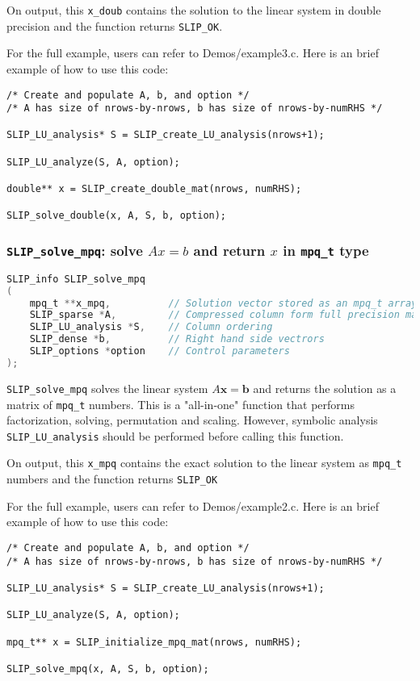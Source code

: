 \documentclass[12pt]{article}
\theoremstyle{definition}
\begin{document}
On output, this \verb|x_doub| contains the solution to the linear system in double precision and the function returns \verb|SLIP_OK|.

For the full example, users can refer to Demos/example3.c. Here is an brief example of how to use this code:

\begin{verbatim}
/* Create and populate A, b, and option */
/* A has size of nrows-by-nrows, b has size of nrows-by-numRHS */

SLIP_LU_analysis* S = SLIP_create_LU_analysis(nrows+1);

SLIP_LU_analyze(S, A, option);

double** x = SLIP_create_double_mat(nrows, numRHS);

SLIP_solve_double(x, A, S, b, option);

\end{verbatim}


\cprotect\subsubsection{\verb|SLIP_solve_mpq|: solve $Ax=b$ and return $x$ in \verb|mpq_t| type}\label{ss:SLIP_solve_mpq}

\begin{lstlisting}[language=C,frame=single]
SLIP_info SLIP_solve_mpq
(
    mpq_t **x_mpq,          // Solution vector stored as an mpq_t array
    SLIP_sparse *A,         // Compressed column form full precision matrix A
    SLIP_LU_analysis *S,    // Column ordering
    SLIP_dense *b,          // Right hand side vectrors
    SLIP_options *option    // Control parameters
);
\end{lstlisting}

\verb|SLIP_solve_mpq| solves the linear system $A\mathbf{x}=\mathbf{b}$ and returns the solution as a matrix of \verb|mpq_t| numbers. This is a "all-in-one" function that performs factorization, solving, permutation and scaling. However, symbolic analysis \verb|SLIP_LU_analysis| should be performed before calling this function.

On output, this \verb|x_mpq| contains the exact solution to the linear system as \verb|mpq_t| numbers and the function returns \verb|SLIP_OK|

For the full example, users can refer to Demos/example2.c. Here is an brief example of how to use this code:

\begin{verbatim}
/* Create and populate A, b, and option */
/* A has size of nrows-by-nrows, b has size of nrows-by-numRHS */

SLIP_LU_analysis* S = SLIP_create_LU_analysis(nrows+1);

SLIP_LU_analyze(S, A, option);

mpq_t** x = SLIP_initialize_mpq_mat(nrows, numRHS);

SLIP_solve_mpq(x, A, S, b, option);

\end{verbatim}
\end{document}
